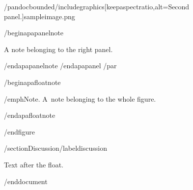 /pandocbounded{/includegraphics[keepaspectratio,alt={Second panel.}]{sampleimage.png}}

/begin{apapanelnote}

A note belonging to the right panel.

/end{apapanelnote}
/end{apapanel}%
/par

/begin{apafloatnote}

/emph{Note}. A~note belonging to the whole figure.

/end{apafloatnote}

/end{figure}

/section{Discussion}/label{discussion}

Text after the float.




/end{document}

